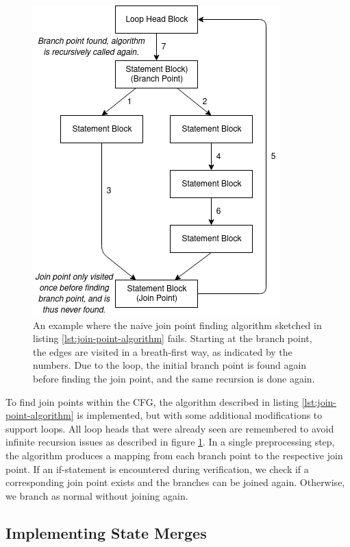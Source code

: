\documentclass[11pt]{article}
\begin{document}
    \begin{figure}[H]
        \begin{center}
            \includegraphics[width=0.6\linewidth]{join-point-problem.png}
            \caption{
                An example where the naive join point finding algorithm sketched in 
                listing \ref{lst:join-point-algorithm}
                fails. Starting at the branch point, the edges are visited in a breath-first way, as indicated by
                the numbers. Due to the loop, the initial branch point is found again before finding
                the join point, and the same recursion is done again.
            }
            \label{fig:join-point-problem}
        \end{center}   
    \end{figure}

    To find join points within the CFG, the algorithm described in listing \ref{lst:join-point-algorithm} is implemented,
    but with some additional modifications to support loops. All loop heads that
    were already seen are remembered to avoid infinite recursion issues as described
    in figure \ref{fig:join-point-problem}.
    In a single preprocessing step, the algorithm produces a mapping from each branch point to the respective join point.
    If an if-statement is encountered during verification, we check if a 
    corresponding join point exists and the branches can be joined again.
    Otherwise, we branch as normal without joining again.

    \subsection{Implementing State Merges} \label{implementing-state-merges}
\end{document}
